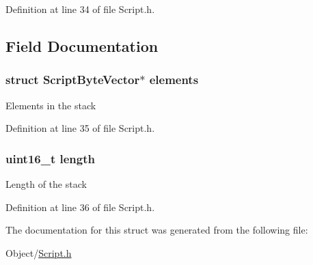 Definition at line 34 of file Script.h.



\subsection{Field Documentation}
\hypertarget{struct_m_i_script_stack_a446fd0b9b98ef2754d5ccf283e840f19}{
\subsubsection[{elements}]{\setlength{\rightskip}{0pt plus 5cm}struct {\bf ScriptByteVector}$\ast$ {\bf elements}}}
\label{struct_m_i_script_stack_a446fd0b9b98ef2754d5ccf283e840f19}
Elements in the stack 

Definition at line 35 of file Script.h.

\hypertarget{struct_m_i_script_stack_a1892eba2086d12ac2b09005aeb09ea3b}{
\subsubsection[{length}]{\setlength{\rightskip}{0pt plus 5cm}uint16\_\-t {\bf length}}}
\label{struct_m_i_script_stack_a1892eba2086d12ac2b09005aeb09ea3b}
Length of the stack 

Definition at line 36 of file Script.h.



The documentation for this struct was generated from the following file:\begin{DoxyCompactItemize}
\item 
Object/\hyperlink{_m_i_script_8h}{Script.h}\end{DoxyCompactItemize}
